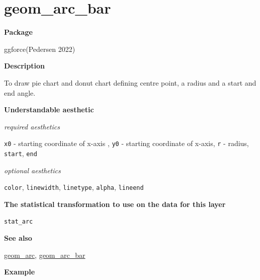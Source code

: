 \documentclass[
  letterpaper,
  DIV=11,
  numbers=noendperiod]{scrreprt}
\begin{document}
\section{geom\_arc\_bar}\label{arcbar}

\textbf{Package}

ggforce(Pedersen 2022)

\textbf{Description}

To draw pie chart and donut chart defining centre point, a radius and a
start and end angle.

\textbf{Understandable aesthetic}

\emph{required aesthetics}

\texttt{x0} - starting coordinate of x-axis , \texttt{y0} - starting
coordinate of x-axis, \texttt{r} - radius, \texttt{start}, \texttt{end}

\emph{optional aesthetics}

\texttt{color}, \texttt{linewidth}, \texttt{linetype}, \texttt{alpha},
\texttt{lineend}

\textbf{The statistical transformation to use on the data for this
layer}

\texttt{stat\_arc}

\textbf{See also}

\hyperref[arc]{geom\_arc}, \hyperref[arcbar]{geom\_arc\_bar}

\textbf{Example}
\end{document}
